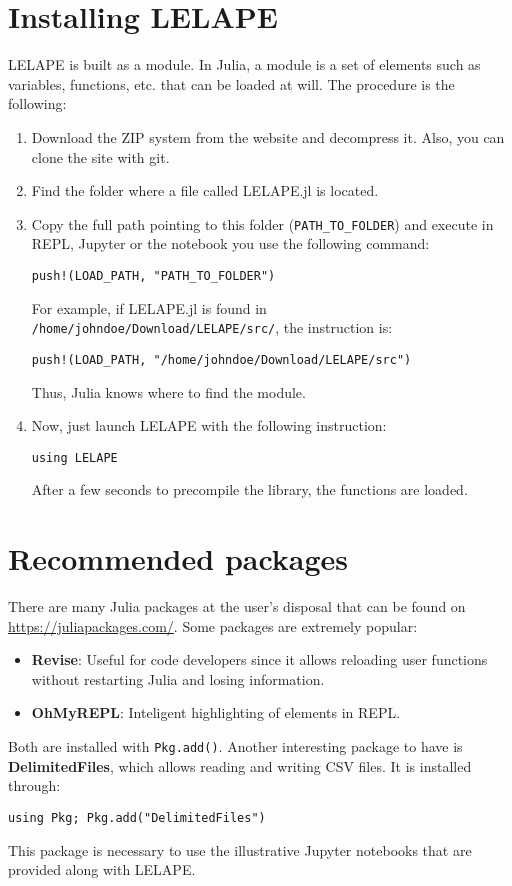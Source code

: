 \section{Installing LELAPE}
LELAPE is built as a module. In Julia, a module is a set of elements such as variables, functions, etc. that can be loaded at will. The procedure is the following:
%
\begin{enumerate}
	\item Download the ZIP system from the website and decompress it. Also, you can clone the site with git.
	\item Find the folder where a file called LELAPE.jl is located.
	\item Copy the full path pointing to this folder (\texttt{PATH\_TO\_FOLDER}) and execute in REPL, Jupyter or the notebook you use the following command:
	
	\texttt{push!(LOAD\_PATH, "PATH\_TO\_FOLDER")}
	
	For example, if LELAPE.jl is found in \texttt{/home/johndoe/Download/LELAPE/src/}, the instruction is:
	
		\texttt{push!(LOAD\_PATH, "/home/johndoe/Download/LELAPE/src")}
	
	Thus, Julia knows where to find the module.
	\item Now, just launch LELAPE with the following instruction:
	
	\texttt{using LELAPE}
	
	After a few seconds to precompile the library, the functions are loaded.
\end{enumerate}
%
\section{Recommended packages}
%
There are many Julia packages at the user's disposal that can be found on \href{https://juliapackages.com/}{https://juliapackages.com/}. Some packages are extremely popular:
\begin{itemize}
	\item \textbf{Revise}: Useful for code developers since it allows reloading user functions without restarting Julia and losing information.
	\item \textbf{OhMyREPL}: Inteligent highlighting of elements in REPL.
\end{itemize}

Both are installed with \texttt{Pkg.add()}. Another interesting package to have is \textbf{DelimitedFiles}, which allows reading and writing CSV files. It is installed through:

\texttt{using Pkg; Pkg.add("DelimitedFiles")}

This package is necessary to use the illustrative Jupyter notebooks that are provided along with LELAPE.
